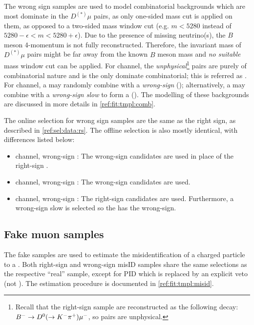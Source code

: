 The wrong sign samples are used to model combinatorial backgrounds which are
most dominate in the $D^{(*)}\mu$ pairs,
as only one-sided mass cut is applied on them, as opposed to a two-sided
mass window cut
(e.g. $m < 5280$ instead of $5280 - \epsilon < m < 5280 + \epsilon$).
Due to the presence of missing neutrino(s), the $B$ meson 4-momentum is not
fully reconstructed.
Therefore,
the invariant mass of $D^{(*)}\mu$ pairs might be far away from the known $B$
meson mass and \emph{no suitable} mass window cut can be applied.
For \Dz channel, the \emph{unphysical}\footnote{
    Recall that the right-sign sample are reconstructed as the following decay:
    ${{{B}^-}} \rightarrow {\ensuremath{{D}^0}} (\rightarrow {\ensuremath{{K}^-}} {\ensuremath{{\pi}^+}}) {\mu^-}$,
    so \Dz\mup pairs are unphysical.
} \Dz\mup pairs are purely of combinatorial
nature and is the only dominate combinatorial;
this is referred as \BComb.
For \Dstar channel, a \Dstarp may randomly combine with a
\emph{wrong-sign \mup} (\BComb); alternatively, a \Dz may combine with a
\emph{wrong-sign slow \pim} to form a \Dstarm (\DstComb).
The modelling of these backgrounds are discussed in more details in
\cref{ref:fit:tmpl:comb}.

The online selection for wrong sign samples are the same as the right sign,
as described in \cref{ref:sel:data:rs}.
The offline selection is also mostly identical, with differences listed below:

\begin{itemize}
    \item \Dz channel, wrong-sign \mu:
        The wrong-sign \Dz\mup candidates are used in place of the right-sign
        \Dz\mun.
    \item \Dstar channel, wrong-sign \mu:
        The wrong-sign \Dz\mup candidates are used.
    \item \Dstar channel, wrong-sign \pi:
        The right-sign \Dz\mun candidates are used.
        Furthermore, a wrong-sign slow \pim is selected so the \Dstar has the
        wrong-sign.
\end{itemize}


\subsection{Fake muon samples}

The fake \muon samples are used to estimate the misidentification of a charged
particle to a \muon.
Both right-sign and wrong-sign misID samples share the same selections
as the respective ``real'' \muon sample,
except for \muon PID which is replaced by an explicit \muon veto
(not \isMuon).
The estimation procedure is documented in
\cref{ref:fit:tmpl:misid}.
